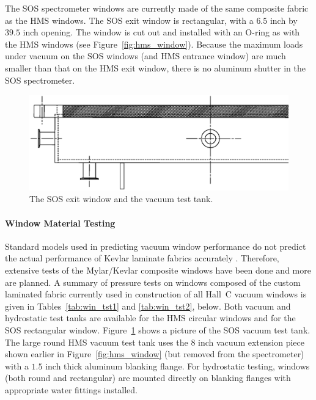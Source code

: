 The SOS spectrometer windows are currently made of the same composite fabric
as the HMS windows. The SOS exit window is rectangular, with a $6.5$ inch
by $39.5$ inch opening.
The window is cut out and installed with an O-ring as with the HMS
windows (see Figure~\ref{fig:hms_window}).
Because the maximum
loads under vacuum on the SOS windows (and HMS entrance window)
are much smaller than that on the HMS exit window,
there is
no aluminum shutter in the SOS spectrometer.

\begin{figure}
\includegraphics[width=6in]{spectrometers/figSOSwindow.eps}
\caption{The SOS exit window and the vacuum test tank. \label{fig:sos_window}}
\end{figure}

\paragraph{Window Material Testing}

Standard models used in predicting vacuum
window performance do not predict the actual performance of Kevlar laminate
fabrics accurately \cite{rbrook1,rllnl2}. Therefore, extensive tests of the
Mylar/Kevlar composite windows have been done and more are planned.
A summary of pressure
tests on windows composed of the custom laminated
fabric currently used in construction of all Hall~C vacuum windows is
given in Tables~\ref{tab:win_tst1} and \ref{tab:win_tst2}, below. Both vacuum and hydrostatic test 
tanks
are available for the HMS circular windows and for the SOS rectangular
window. Figure~\ref{fig:sos_window} shows a picture of the SOS vacuum
test tank.  The large round
HMS vacuum test tank uses the $8$ inch vacuum extension piece shown
earlier in Figure~\ref{fig:hms_window} (but removed from the spectrometer) with a $1.5$
inch thick aluminum blanking flange. For hydrostatic testing, windows (both
round and rectangular) are mounted directly on
blanking flanges with appropriate water fittings installed.

